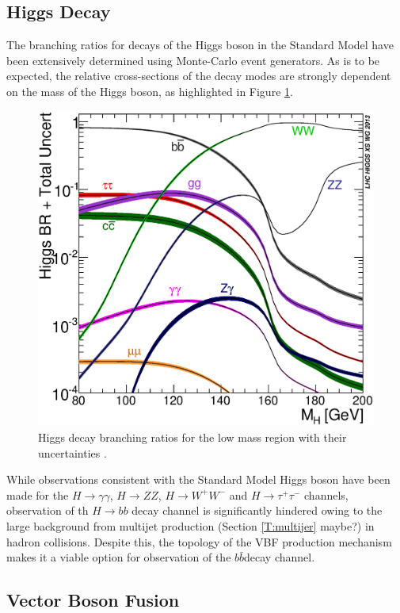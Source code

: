 	\subsection{Higgs Decay} 
	
		The branching ratios for decays of the Higgs boson in the Standard Model have been extensively determined using Monte-Carlo event generators. As is to be expected, the relative cross-sections of the decay modes are strongly dependent on the mass of the Higgs boson, as highlighted in Figure \ref{fig:higgsbrlm}. 
	
		\begin{figure}[h]
			\centering
			\includegraphics[width=0.5\linewidth]{T/FIGS/Higgs_BR_LM}
			\caption{Higgs decay branching ratios for the low mass region with their uncertainties \cite{LHCHiggsXS2013}.}
			\label{fig:higgsbrlm}
		\end{figure}
		
		While observations consistent with the Standard Model Higgs boson have been made for the $H\rightarrow \gamma\gamma$, $H\rightarrow ZZ$, $H\rightarrow W^+W^-$ and $H\rightarrow \tau^+\tau^-$ channels, observation of th $H\rightarrow bb$ decay channel is significantly hindered owing to the large background from multijet production (Section \ref{T:multijer} maybe?) in hadron collisions. Despite this, the topology of the VBF production mechanism makes it a viable option for observation of the  $b\bar{b}$decay  channel.

	
	\subsection{Vector Boson Fusion}
	
	
	
	
\endinput
